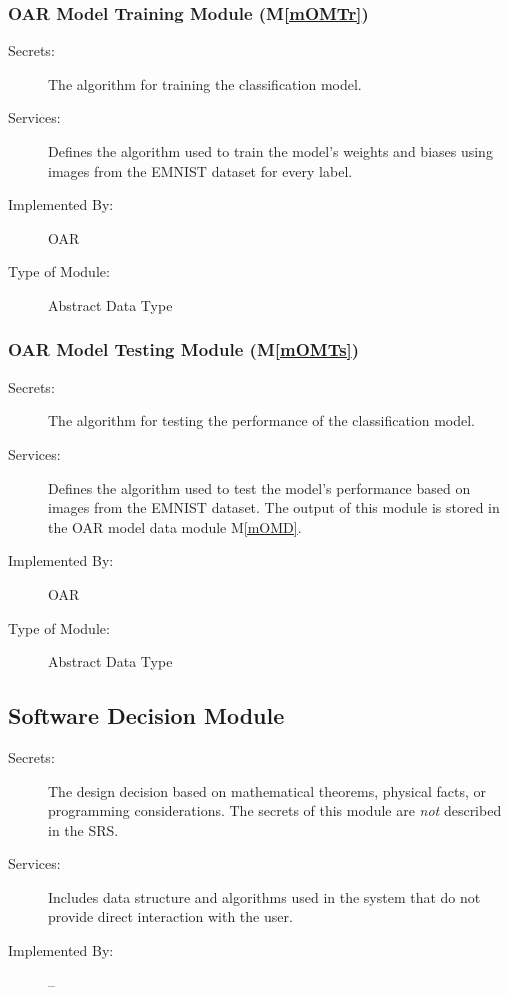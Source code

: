 \documentclass[12pt, titlepage]{article}
\newcommand{\mref}[1]{M\ref{#1}}
\begin{document}
\subsubsection{OAR Model Training Module (\mref{mOMTr})}

\begin{description}
\item[Secrets:] The algorithm for training the classification model.
\item[Services:] Defines the algorithm used to train the model's weights and biases using images from the EMNIST dataset for every label.
\item[Implemented By:] OAR
\item[Type of Module:] Abstract Data Type
\end{description}

\subsubsection{OAR Model Testing Module (\mref{mOMTs})}

\begin{description}
\item[Secrets:] The algorithm for testing the performance of the classification model.
\item[Services:] Defines the algorithm used to test the model's performance based on images from the EMNIST dataset. The output of this
module is stored in the OAR model data module \mref{mOMD}.
\item[Implemented By:] OAR
\item[Type of Module:] Abstract Data Type
\end{description}


\subsection{Software Decision Module}

\begin{description}
\item[Secrets:] The design decision based on mathematical theorems, physical
  facts, or programming considerations. The secrets of this module are
  \emph{not} described in the SRS.
\item[Services:] Includes data structure and algorithms used in the system that
  do not provide direct interaction with the user. 
\item[Implemented By:] --
\end{description}
\end{document}
